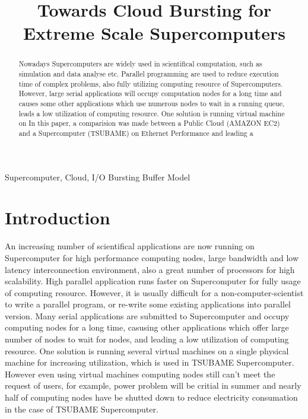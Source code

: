 \documentclass[JIP,draft]{ipsj}
\begin{document}
\title{Towards Cloud Bursting for Extreme Scale Supercomputers}

\begin{abstract}
Nowadays Supercomputers are widely used in scientifical computation, such as simulation and data analyse etc. 
Parallel programming are used to reduce execution time of complex problems, also fully utilizing computing resource of Supercomputers.
However, large serial applications will occupy computation nodes for a long time and causes some other applications which use numerous nodes to wait in a running queue, leads a low utilization of computing resource.
One solution is running virtual machine on 
In this paper, a comparision was made between a Public Cloud (AMAZON EC2) and a Supercomputer (TSUBAME) on Ethernet Performance and leading a 
\end{abstract}

\begin{keyword}
Supercomputer, Cloud, I/O Bursting Buffer Model
\end{keyword}

\maketitle

\section{Introduction}
An increasing number of scientifical applications are now running on Supercomputer for high performance computing nodes, large bandwidth and low latency interconnection environment, also a great number of processors for high scalability.
High parallel application runs faster on Supercomputer for fully usage of computing resource.
However, it is usually difficult for a non-computer-scientist to write a parallel program, or re-write some existing applications into parallel version.
Many serial applications are submitted to Supercomputer and occupy computing nodes for a long time, casusing other applications which offer large number of nodes to wait for nodes, and leading a low utilization of computing resource.
One solution is running several virtual machines on a single physical machine for increasing utilization, which is used in TSUBAME Supercomputer.
However even using virtual machines computing nodes still can't meet the request of users, for example, power problem will be critial in summer and nearly half of computing nodes have be shutted down to reduce electricity consumation in the case of TSUBAME Supercomputer. 
\end{document}
